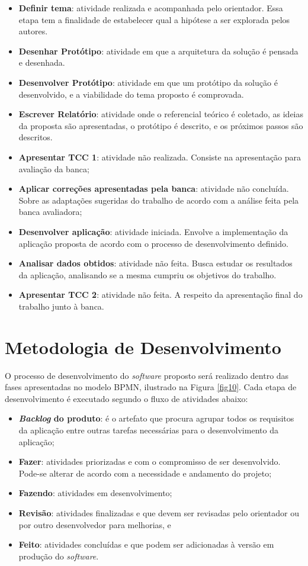 \begin{itemize}
		\item \textbf{Definir tema}: atividade realizada e acompanhada pelo orientador. Essa etapa tem a finalidade de estabelecer qual a hipótese a ser explorada pelos autores.
		\item \textbf{Desenhar Protótipo}: atividade em que a arquitetura da solução é pensada e desenhada.
		\item \textbf{Desenvolver Protótipo}: atividade em que um protótipo da solução é desenvolvido, e a viabilidade do tema proposto é comprovada.
		\item \textbf{Escrever Relatório}: atividade onde o referencial teórico é coletado, as ideias da proposta são apresentadas, o protótipo é descrito, e os próximos passos são descritos.
		\item \textbf{Apresentar TCC 1}: atividade não realizada. Consiste na apresentação para avaliação da banca;
		\item \textbf{Aplicar correções apresentadas pela banca}: atividade não concluída. Sobre as adaptações sugeridas do trabalho de acordo com a análise feita pela banca avaliadora;
		\item \textbf{Desenvolver aplicação}: atividade iniciada. Envolve a implementação da aplicação proposta de acordo com o processo de desenvolvimento definido.
		\item \textbf{Analisar dados obtidos}: atividade não feita. Busca estudar os resultados da aplicação, analisando se a mesma cumpriu os objetivos do trabalho.
		\item \textbf{Apresentar TCC 2}: atividade não feita. A respeito da apresentação final do trabalho junto à banca.
\end{itemize}

\section{Metodologia de Desenvolvimento}

O processo de desenvolvimento do \textit{software} proposto será realizado dentro das fases apresentadas no modelo BPMN, ilustrado na Figura \ref{fig10}. Cada etapa de desenvolvimento é executado segundo o fluxo de atividades abaixo:

\begin{itemize}
		\item \textbf{\textit{Backlog} do produto}: é o artefato que procura agrupar todos os requisitos da aplicação entre outras tarefas necessárias para o desenvolvimento da aplicação;
		\item \textbf{Fazer}: atividades priorizadas e com o compromisso de ser desenvolvido. Pode-se alterar de acordo com a necessidade e andamento do projeto;
		\item \textbf{Fazendo}: atividades em desenvolvimento;
		\item \textbf{Revisão}: atividades finalizadas e que devem ser revisadas pelo orientador ou por outro desenvolvedor para melhorias, e
		\item \textbf{Feito}: atividades concluídas e que podem ser adicionadas à versão em produção do \textit{software}.
\end{itemize}


